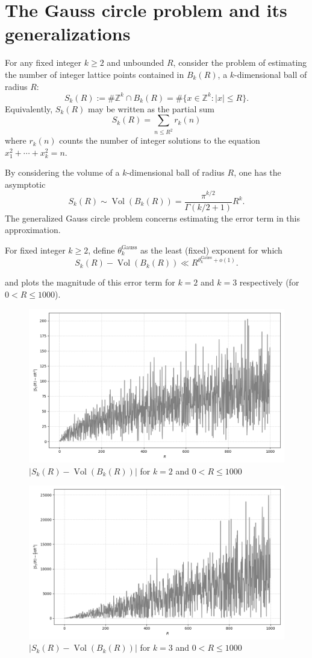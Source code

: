 \chapter{The Gauss circle problem and its generalizations}\label{gauss-circle-chapter}

\unintegrated

For any fixed integer $k \ge 2$ and unbounded $R$, consider the problem of estimating the number of integer lattice points contained in $B_k(R)$, a $k$-dimensional ball of radius $R$:
\[
S_k(R) := \# \mathbb{Z}^k \cap B_k(R) = \# \{x \in \mathbb{Z}^k: |x| \le R\}.
\]
Equivalently, $S_k(R)$ may be written as the partial sum 
\[
S_k(R) = \sum_{n \le R^{2}}r_k(n)
\]
where $r_k(n)$ counts the number of integer solutions to the equation $x_1^2 + \cdots + x_k^2 = n$.

By considering the volume of a $k$-dimensional ball of radius $R$, one has the asymptotic
\[
S_k(R) \sim \operatorname{Vol}(B_k(R)) = \frac{\pi^{k/2}}{\Gamma(k/2 + 1)}R^k.
\]
The generalized Gauss circle problem concerns estimating the error term in this approximation. 

\begin{definition}
For fixed integer $k \ge 2$, define $\theta^{\operatorname{Gauss}}_{k}$ as the least (fixed) exponent for which
\[
S_k(R) - \operatorname{Vol}(B_k(R)) \ll R^{\theta^{\operatorname{Gauss}}_{k} + o(1)}.
\]
\end{definition}

 and  plots the magnitude of this error term for $k = 2$ and $k = 3$ respectively (for $0 < R \le 1000$).

\begin{figure}
    \centering
    \includegraphics[width=0.5\linewidth]{chapter/gauss_circle_error_2.png}
    \caption{$|S_k(R) - \operatorname{Vol}(B_k(R))|$ for $k = 2$ and $0 < R \le 1000$}
    \label{fig:gauss_circle_2}
\end{figure}

\begin{figure}
    \centering
    \includegraphics[width=0.5\linewidth]{chapter/gauss_circle_error_3.png}
    \caption{$|S_k(R) - \operatorname{Vol}(B_k(R))|$ for $k = 3$ and $0 < R \le 1000$}
    \label{fig:gauss_circle_3}
\end{figure}


